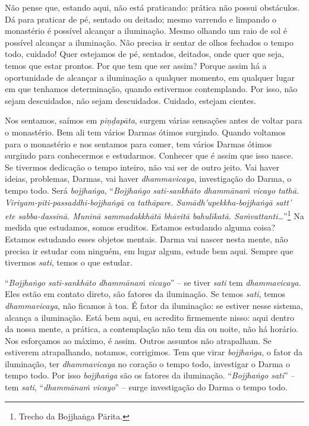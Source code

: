 Não pense que, estando aqui, não está praticando: prática não possui
obstáculos. Dá para praticar de pé, sentado ou deitado; mesmo varrendo
e limpando o monastério é possível alcançar a iluminação. Mesmo olhando
um raio de sol é possível alcançar a iluminação. Não precisa ir sentar
de olhos fechados o tempo todo, cuidado! Quer estejamos de pé,
sentados, deitados, onde quer que seja, temos que estar prontos. Por
que tem que ser assim? Porque assim há a oportunidade de alcançar a
iluminação a qualquer momento, em qualquer lugar em que tenhamos
determinação, quando estivermos contemplando. Por isso, não sejam
descuidados, não sejam descuidados. Cuidado, estejam cientes. 

Nos sentamos, saímos em \emph{piṇḍapāta}, surgem várias
sensações antes de voltar para o monastério. Bem ali tem vários Darmas
ótimos surgindo. Quando voltamos para o monastério e nos sentamos para
comer, tem vários Darmas ótimos surgindo para conhecermos e estudarmos.
Conhecer que é assim que isso nasce. Se tivermos dedicação o tempo
inteiro, não vai ser de outro jeito. Vai haver ideias, problemas,
Darmas, vai haver \emph{dhammavicaya}, investigação do Darma, o tempo
todo. Será \emph{bojjhaṅga}, “\emph{Bojjhaṅgo sati-sankhāto
dhammānaṁ vicayo tathā. Viriyam-pīti-passaddhi-bojjhaṅgā ca
tathāpare. Samādh’upekkha-bojjhaṅgā satt’ ete sabba-dassinā.
Muninā sammadakkhātā bhāvitā bahulīkatā.
Saṁvattanti\ldots{}}”\footnote{Trecho da Bojjhaṅga Pārita.} Na medida que
estudamos, somos eruditos. Estamos estudando alguma coisa? Estamos
estudando esses objetos mentais. Darma vai nascer nesta mente, não
precisa ir estudar com ninguém, em lugar algum, estude bem aqui. Sempre
que tivermos \emph{sati}, temos o que estudar. 

“\emph{Bojjhaṅgo sati-sankhāto dhammānaṁ vicayo}” – se tiver
\emph{sati} tem \emph{dhammavicaya.} Eles estão em contato direto,
são fatores da iluminação. Se temos \emph{sati}, temos
\emph{dhammavicaya}, não ficamos à toa. É fator da iluminação: se
estiver nesse sistema, alcança a iluminação. Está bem aqui, eu acredito
firmemente nisso: aqui dentro da nossa mente, a prática, a contemplação
não tem dia ou noite, não há horário. Nos esforçamos ao máximo, é
assim. Outros assuntos não atrapalham. Se estiverem atrapalhando,
notamos, corrigimos. Tem que virar \emph{bojjhaṅga}, o fator da
iluminação, ter \emph{dhammavicaya} no coração o tempo todo,
investigar o Darma o tempo todo. Por isso \emph{bojjhaṅga} são os
fatores da iluminação. “\emph{Bojjhaṅgo sati}” – tem \emph{sati},
“\emph{dhammānaṁ vicayo}” – surge investigação do Darma o tempo
todo. 

